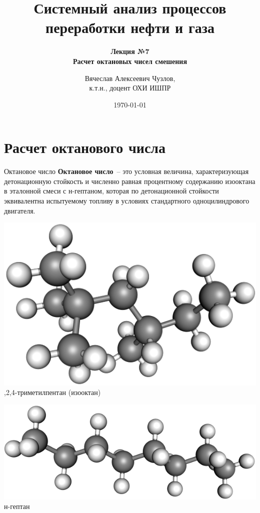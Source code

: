 \documentclass[aspectratio=169, mathserif]{beamer}%
\title{\LARGE{Системный анализ процессов переработки нефти и газа}}
\subtitle{\textcolor{tpugreen}{\textbf{Лекция №7}} \\ \textbf{Расчет октановых чисел смешения}}
\author[]{Вячеслав Алексеевич Чузлов, \\
к.т.н., доцент ОХИ ИШПР}
\date{\today}
\begin{document}

\titleframe%



\section{Расчет октанового числа}
\sectionframe

\begin{frame}[fragile, label=c]{Октановое число}
\scriptsize
\textcolor{tpugreen}{\textbf{Октановое число}}~-- это условная величина, характеризующая детонационную стойкость и численно равная процентному содержанию изооктана в эталонной смеси с н-гептаном, которая по детонационной стойкости эквивалентна испытуемому топливу в условиях стандартного одноцилиндрового двигателя.
\vfill
{}
\vfill
\begin{minipage}{.48\textwidth}
\includegraphics[width=.95\linewidth]{./pics/ic8}
,2,4-триметилпентан (изооктан)
\end{minipage}
\begin{minipage}{.01\textwidth}
\hfill
\end{minipage}
\begin{minipage}{.48\textwidth}
\includegraphics[width=\linewidth]{./pics/nc7}
\centering н-гептан
\end{minipage}
\vfill
\end{frame}
\end{document}
